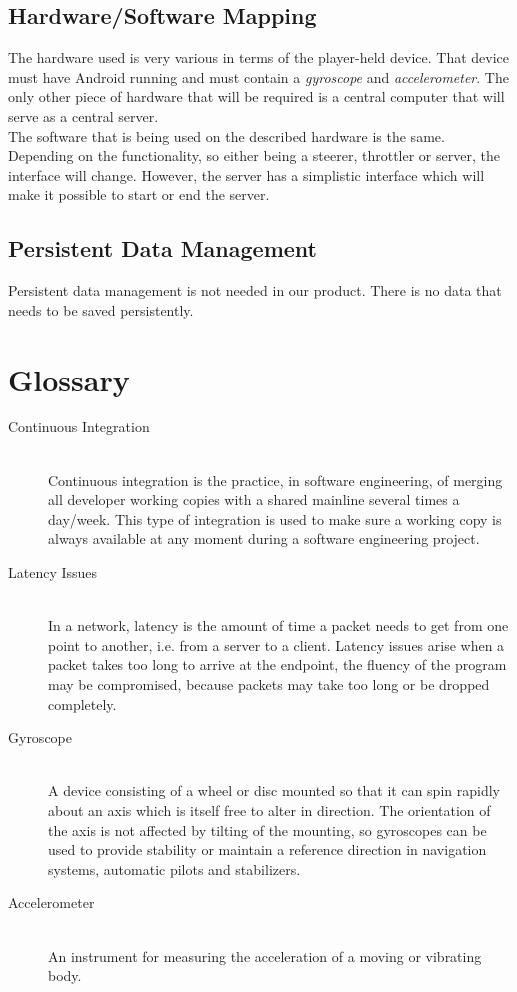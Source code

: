 \documentclass[11pt,twoside,a4paper]{article}
\begin{document}
\subsection{Hardware/Software Mapping}
The hardware used is very various in terms of the player-held device. That device must have Android running and must contain a \emph{gyroscope} and \emph{accelerometer}. The only other piece of hardware that will be required is a central computer that will serve as a central server. \\
The software that is being used on the described hardware is the same. Depending on the functionality, so either being a steerer, throttler or server, the interface will change. However, the server has a simplistic interface which will make it possible to start or end the server.


\subsection{Persistent Data Management}
Persistent data management is not needed in our product. There is no data that needs to be saved persistently.

\newpage

\section{Glossary}
\begin{description}
\item[Continuous Integration] \hfill \\
Continuous integration is the practice, in software engineering, of merging all developer working copies with a shared mainline several times a day/week. This type of integration is used to make sure a working copy is always available at any moment during a software engineering project.
\item[Latency Issues] \hfill \\
In a network, latency is the amount of time a packet needs to get from one point to another, i.e. from a server to a client. Latency issues arise when a packet takes too long to arrive at the endpoint, the fluency of the program may be compromised, because packets may take too long or be dropped completely. 
\item[Gyroscope] \hfill \\
A device consisting of a wheel or disc mounted so that it can spin rapidly about an axis which is itself free to alter in direction. The orientation of the axis is not affected by tilting of the mounting, so gyroscopes can be used to provide stability or maintain a reference direction in navigation systems, automatic pilots and stabilizers.
\item[Accelerometer] \hfill \\
An instrument for measuring the acceleration of a moving or vibrating body.
\end{description}
\end{document}
